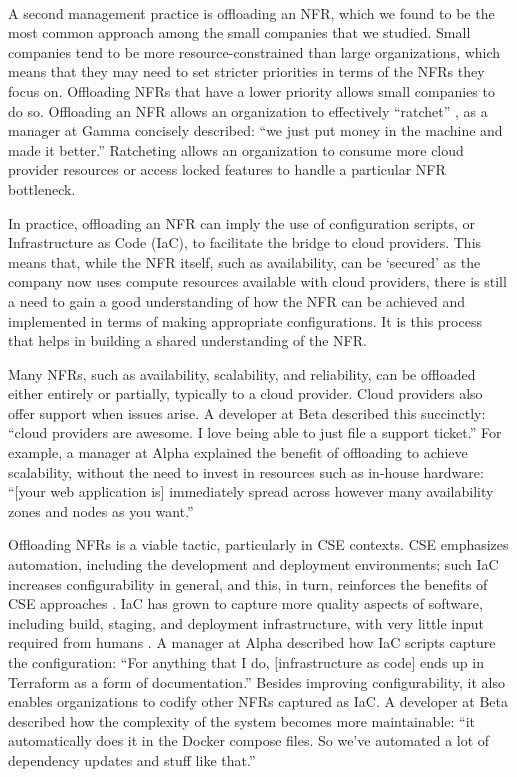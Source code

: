 \documentclass[smallextended]{svjour3}        %
\providecommand{\DIFaddtex}[1]{{\protect\color{blue}\uwave{#1}}} %
\providecommand{\DIFaddbegin}{} %
\providecommand{\DIFaddend}{} %
\providecommand{\DIFadd}[1]{\texorpdfstring{\DIFaddtex{#1}}{#1}} %
\newcommand{\DIFaddincludegraphics}[2][]{{\color{blue}\fbox{\DIFOincludegraphics[#1]{#2}}}} %
\DeclareRobustCommand{\DIFaddbegin}{\DIFOaddbegin \let\includegraphics\DIFaddincludegraphics} %
\DeclareRobustCommand{\DIFaddend}{\DIFOaddend \let\includegraphics\DIFOincludegraphics} %
\begin{document}
\DIFaddbegin \paragraph{\DIFadd{Offloading an NFR}} \DIFaddend A second management practice is offloading an NFR, which we found to be the most common approach among the small companies that we studied. 
Small companies tend to be more resource-constrained than large organizations, which means that they may need to set stricter priorities in terms of the NFRs they focus on. Offloading NFRs that have a lower priority allows small companies to do so. 
Offloading an NFR allows an organization to effectively ``ratchet'' \citep{bellomo2014}, as a manager at Gamma concisely described: \textmd{``we just put money in the machine and made it better.''}
Ratcheting allows an organization to consume more cloud provider resources or access locked features to handle a particular NFR bottleneck.

In practice, offloading an NFR can imply the use of configuration scripts, or Infrastructure as Code (IaC), to facilitate the bridge to cloud providers. This means that, while the NFR itself, such as availability, can be `secured' as the company now uses compute resources available with cloud providers, there is still a need to gain a good understanding of how the NFR can be achieved and implemented in terms of making appropriate configurations. It is this process that helps in building a shared understanding of the NFR. 


Many NFRs, such as availability, scalability, and reliability, can be offloaded either entirely or partially, typically to a cloud provider.  
Cloud providers also offer support when issues arise. A developer at Beta described this succinctly: \textmd{``cloud providers are awesome. I love being able to just file a support ticket.''}
For example, a manager at Alpha explained the benefit of offloading to achieve scalability, without the need to invest in resources such as in-house hardware:
\textmd{``[your web application is] immediately spread across however many availability zones and nodes as you want.''}



Offloading NFRs is a viable tactic, particularly in CSE contexts. CSE emphasizes automation, including the development and deployment environments; such IaC increases configurability in general, and this, in turn, reinforces the benefits of CSE approaches \citep{humble2010continuous}.
IaC has grown to capture more quality aspects of software, including build, staging, and deployment infrastructure, with very little input required from humans \citep{humble2018accelerate}.
A manager at Alpha described how IaC scripts capture the configuration:
\textmd{``For anything that I do, [infrastructure as code] ends up in Terraform as a form of documentation.''} 
Besides improving configurability, it also enables organizations to codify other NFRs captured as IaC. 
A developer at Beta described how the complexity of the system becomes more maintainable:
\textmd{``it automatically does it in the Docker compose files. So we've automated a lot of dependency updates and stuff like that.''}
\end{document}
